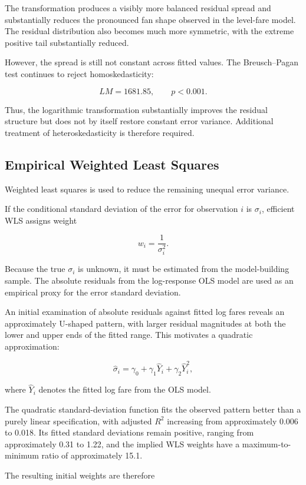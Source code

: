 \documentclass[11pt,a4paper]{article}
\begin{document}
The transformation produces a visibly more balanced residual spread and substantially reduces the pronounced fan shape observed in the level-fare model. The residual distribution also becomes much more symmetric, with the extreme positive tail substantially reduced.

However, the spread is still not constant across fitted values. The Breusch--Pagan test continues to reject homoskedasticity:

\[
LM = 1681.85,
\qquad
p < 0.001.
\]

Thus, the logarithmic transformation substantially improves the residual structure but does not by itself restore constant error variance. Additional treatment of heteroskedasticity is therefore required.

\subsection{Empirical Weighted Least Squares}

Weighted least squares is used to reduce the remaining unequal error variance.

If the conditional standard deviation of the error for observation \(i\) is \(\sigma_i\), efficient WLS assigns weight

\[
w_i = \frac{1}{\sigma_i^2}.
\]

Because the true \(\sigma_i\) is unknown, it must be estimated from the model-building sample. The absolute residuals from the log-response OLS model are used as an empirical proxy for the error standard deviation.

An initial examination of absolute residuals against fitted log fares reveals an approximately U-shaped pattern, with larger residual magnitudes at both the lower and upper ends of the fitted range. This motivates a quadratic approximation:

\[
\widehat{\sigma}_i
=
\gamma_0
+
\gamma_1 \widehat{Y}_i
+
\gamma_2 \widehat{Y}_i^2,
\]

where \(\widehat{Y}_i\) denotes the fitted log fare from the OLS model.

The quadratic standard-deviation function fits the observed pattern better than a purely linear specification, with adjusted \(R^2\) increasing from approximately 0.006 to 0.018. Its fitted standard deviations remain positive, ranging from approximately 0.31 to 1.22, and the implied WLS weights have a maximum-to-minimum ratio of approximately 15.1.

The resulting initial weights are therefore
\end{document}
